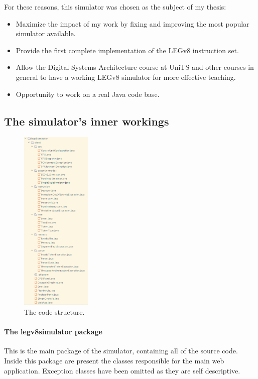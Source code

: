 For these reasons, this simulator was chosen as the subject of my thesis:

\begin{itemize}[label=\textendash]
	\item Maximize the impact of my work by fixing and improving the most popular simulator available.
	\item Provide the first complete implementation of the LEGv8 instruction set.
	\item Allow the Digital Systems Architecture course at UniTS and other courses in general to have a working LEGv8 simulator for more effective teaching.
	\item Opportunity to work on a real Java code base.
\end{itemize}

\subsection*{The simulator's inner workings}

\begin{figure}
	\centering
	\includegraphics[width=0.30\textwidth]{img/classes.png}
	\caption{The code structure.}
\end{figure}

\paragraph*{The legv8simulator package}

This is the main package of the simulator, containing all of the source code. Inside this package are present the classes responsible for the main web application. Exception classes have been omitted as they are self descriptive.

